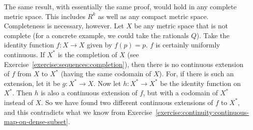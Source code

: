 \begin{solution}
  The same result, with essentially the same proof, would hold in any
  complete metric space. This includes $R^k$ as well as any compact
  metric space. Completeness is necessary, however. Let $X$ be any
  metric space that is not complete (for a concrete example, we could
  take the rationals $Q$). Take the identity function $f\colon X\to X$
  given by $f(p) = p$. $f$ is certainly uniformly continuous. If $X^*$
  is the completion of $X$ (see
  Exercise~\ref{exercise:sequences:completion}), then there is no
  continuous extension of $f$ from $X$ to $X^*$ (having the same
  codomain of $X$). For, if there is such an extension, let it be
  $g\colon X^*\to X$. Now let $h\colon X^*\to X^*$ be the identity
  function on $X^*$. Then $h$ is also a continuous extension of $f$,
  but with a codomain of $X^*$ instead of $X$. So we have found two
  different continuous extensions of $f$ to $X^*$, and this
  contradicts what we know from
  Exercise~\ref{exercise:continuity:continuous-map-on-dense-subset}.
\end{solution}
